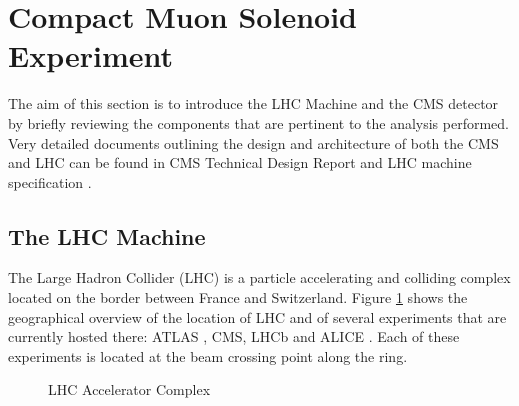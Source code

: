 \section{Compact Muon Solenoid Experiment} \label{section:higgs_cms}
The aim of this section is to introduce the LHC Machine and the CMS detector by  briefly reviewing the components that are pertinent to the analysis performed. Very detailed documents outlining the design and architecture of both the CMS and LHC can be found in CMS Technical Design Report \cite{TDR,CMSExperiment} and LHC machine specification \cite{lhcMachine}.

\subsection{The LHC Machine} \label{subsection:higgs_cms_lhc}
The Large Hadron Collider (LHC) is a particle accelerating and colliding complex located on the border between France and Switzerland. Figure \ref{fig:higgs_cms_lhc} shows the geographical overview of the location of LHC and of several experiments that are currently hosted there: ATLAS \cite{ATLASExperiment}, CMS, LHCb \cite{LHCbExperiment} and ALICE \cite{ALICEExperiment}. Each of these experiments is located at the beam crossing point along the ring.
\begin{figure}[hbp]
    \centering
    \caption{LHC Accelerator Complex}
    \label{fig:higgs_cms_lhc}
 \end{figure}

